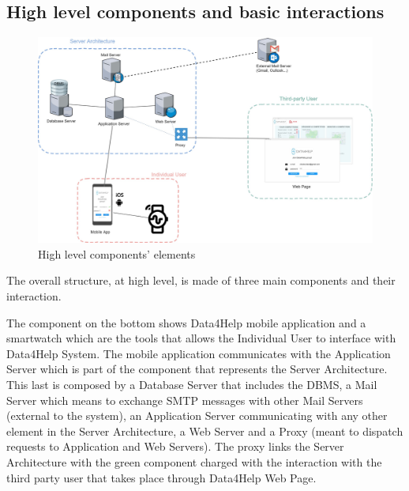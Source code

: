 \subsection{High level components and basic interactions}
\label{subsect:highLevel}
\begin{figure}[h]
\caption{High level components' elements}
\includegraphics[width = \textwidth]{sections/architecturalDesign/overview_1.jpg}
\end{figure}

The overall structure, at high level, is made of three main components and their interaction. 

The component on the bottom shows Data4Help mobile application and a smartwatch which are the tools that allows the Individual User to interface with Data4Help System. The mobile application communicates with the Application Server which is part of the component that represents the Server Architecture. 
This last is composed by a Database Server that includes the DBMS, a Mail Server which means to exchange SMTP messages with other Mail Servers (external to the system), an Application Server communicating with any other element in the Server Architecture, a Web Server and a Proxy (meant to dispatch requests to Application and Web Servers). 
The proxy links the Server Architecture with the green component charged with the interaction with the third party user that takes place through Data4Help Web Page. 

